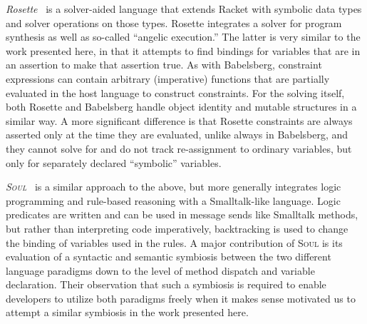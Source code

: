 
\emph{Rosette}~\cite{torlak2013growing} is a solver-aided language that extends
Racket with symbolic data types and solver operations on those types. Rosette
integrates a solver for program synthesis as well as so-called ``angelic
execution.'' The latter is very similar to the work presented here, in that it
attempts to find bindings for variables that are in an assertion to make that
assertion true. As with Babelsberg, constraint expressions can contain arbitrary
(imperative) functions that are partially evaluated in the host language to
construct constraints. For the solving itself, both Rosette and Babelsberg
handle object identity and mutable structures in a similar way. A more
significant difference is that Rosette constraints are always asserted only at
the time they are evaluated, unlike always in Babelsberg, and they cannot solve
for and do not track re-assignment to ordinary variables, but only for
separately declared ``symbolic'' variables.

\emph{\textsc{Soul}}~\cite{DHondt:2004:soul-symbiosis} is a similar approach to the above,
but more generally integrates logic programming and rule-based reasoning with a
Smalltalk-like language. Logic predicates are written and can be used in message
sends like Smalltalk methods, but rather than interpreting code imperatively,
backtracking is used to change the binding of variables used in the rules. A
major contribution of \textsc{Soul} is its evaluation of a syntactic and
semantic symbiosis between the two different language paradigms down to the
level of method dispatch and variable declaration. Their observation that such a
symbiosis is required to enable developers to utilize both paradigms freely when
it makes sense motivated us to attempt a similar symbiosis in the work presented
here.

